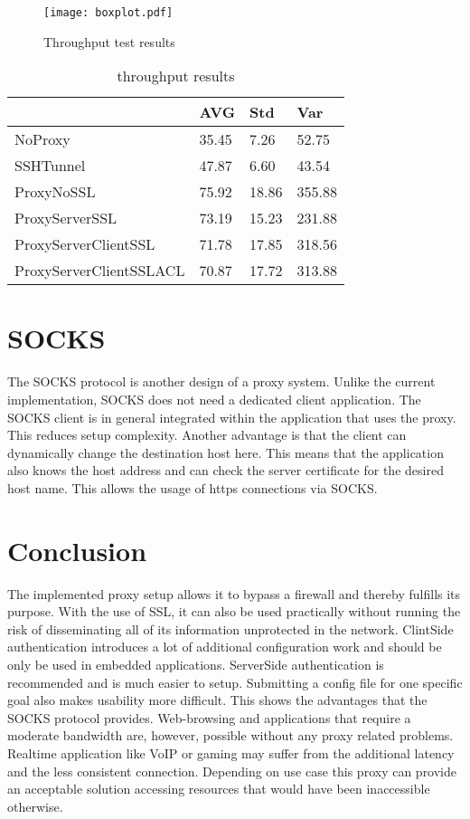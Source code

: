 \documentclass[12pt, a4paper]{scrartcl}
\begin{document}
\begin{figure}[]
    \centering
    \texttt{[image: boxplot.pdf]}
    \caption{Throughput test results}\label{fig::boxres}
\end{figure}
\begin{table}[]
    \centering
    \begin{tabular}{|l|l|l|l|}
    \hline
                            & AVG   & Std   & Var    \\ \hline
    NoProxy                 & 35.45 & 7.26  & 52.75  \\ \hline
    SSHTunnel               & 47.87 & 6.60  & 43.54  \\ \hline
    ProxyNoSSL              & 75.92 & 18.86 & 355.88 \\ \hline
    ProxyServerSSL          & 73.19 & 15.23 & 231.88 \\ \hline
    ProxyServerClientSSL    & 71.78 & 17.85 & 318.56 \\ \hline
    ProxyServerClientSSLACL & 70.87 & 17.72 & 313.88 \\ \hline
    \end{tabular}
    \caption{ throughput results}\label{tab::vals}
    \end{table}

\section{SOCKS}
The SOCKS protocol is another design of a proxy system. Unlike the current implementation, SOCKS does not need a dedicated client application. The SOCKS client is in general integrated within the application that uses the proxy. This reduces setup complexity. Another advantage is that the client can dynamically change the destination host here. This means that the application also knows the host address and can check the server certificate for the desired host name. This allows the usage of https connections via SOCKS.

\section{Conclusion}
The implemented proxy setup allows it to bypass a firewall and thereby fulfills its purpose. With the use of \ac{SSL}, it can also be used practically without running the risk of disseminating all of its information unprotected in the network. ClintSide authentication introduces a lot of additional configuration work and should be only be used in embedded applications. ServerSide authentication is recommended and is much easier to setup.\newline
Submitting a config file for one specific goal also makes usability more difficult. This shows the advantages that the SOCKS protocol provides. Web-browsing and applications that require a moderate bandwidth are, however, possible without any proxy related problems. Realtime application like \ac{VoIP} or gaming may suffer from the additional latency and the less consistent connection.\newline
Depending on use case this proxy can provide an acceptable solution accessing resources that would have been inaccessible otherwise.
\end{document}
